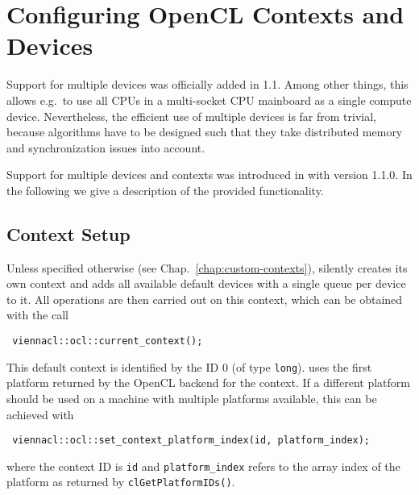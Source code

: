 
\chapter{Configuring OpenCL Contexts and Devices} \label{chap:multi-devices}
Support for multiple devices was officially added in {\OpenCL} 1.1.
Among other things, this allows e.g.~to use all CPUs in a multi-socket CPU mainboard as a single {\OpenCL} compute device.
Nevertheless, the efficient use of multiple {\OpenCL} devices is far from trivial, because algorithms have to be designed such that
they take distributed memory and synchronization issues into account.

Support for multiple {\OpenCL} devices and contexts was introduced in {\ViennaCL} with version 1.1.0. In the following we give a description of the
provided functionality.


\section{Context Setup}
Unless specified otherwise (see Chap.~\ref{chap:custom-contexts}), {\ViennaCL} silently creates its own context and adds all available default devices with a single queue per device to it.
All operations are then carried out on this context, which can be obtained with the call
\begin{lstlisting}
 viennacl::ocl::current_context();
\end{lstlisting}
This default context is identified by the ID $0$ (of type \lstinline|long|).
{\ViennaCL} uses the first platform returned by the OpenCL backend for the context.
If a different platform should be used on a machine with multiple platforms available,
this can be achieved with
\begin{lstlisting}
 viennacl::ocl::set_context_platform_index(id, platform_index);
\end{lstlisting}
where the context ID is \lstinline|id| and \lstinline|platform_index| refers to the array index of the platform as returned by \lstinline|clGetPlatformIDs()|.

